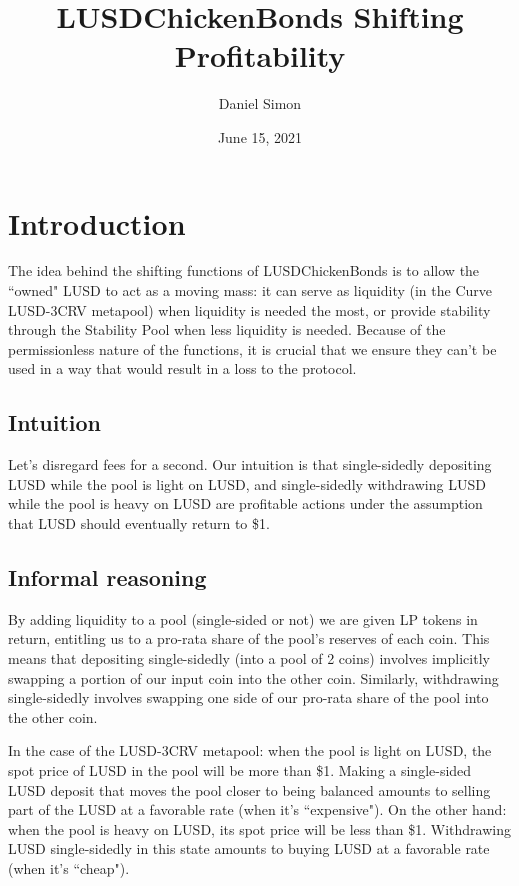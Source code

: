 \documentclass{article}
\begin{document}
\title{\textbf{LUSDChickenBonds Shifting Profitability}}
\author{Daniel Simon}
\date{June 15, 2021}

\maketitle

\section{Introduction}
The idea behind the shifting functions of LUSDChickenBonds is to allow the ``owned" LUSD to act as a moving mass: it can serve as liquidity (in the Curve LUSD-3CRV metapool) when liquidity is needed the most, or provide stability through the Stability Pool when less liquidity is needed. Because of the permissionless nature of the functions, it is crucial that we ensure they can't be used in a way that would result in a loss to the protocol.

\subsection{Intuition}
Let's disregard fees for a second. Our intuition is that single-sidedly depositing LUSD while the pool is light on LUSD, and single-sidedly withdrawing LUSD while the pool is heavy on LUSD are profitable actions under the assumption that LUSD should eventually return to \$1.

\subsection{Informal reasoning}

By adding liquidity to a pool (single-sided or not) we are given LP tokens in return, entitling us to a pro-rata share of the pool's reserves of each coin. This means that depositing single-sidedly (into a pool of 2 coins) involves implicitly swapping a portion of our input coin into the other coin. Similarly, withdrawing single-sidedly involves swapping one side of our pro-rata share of the pool into the other coin.

In the case of the LUSD-3CRV metapool: when the pool is light on LUSD, the spot price of LUSD in the pool will be more than \$1. Making a single-sided LUSD deposit that moves the pool closer to being balanced amounts to selling part of the LUSD at a favorable rate (when it's ``expensive"). On the other hand: when the pool is heavy on LUSD, its spot price will be less than \$1. Withdrawing LUSD single-sidedly in this state amounts to buying LUSD at a favorable rate (when it's ``cheap").
\end{document}
